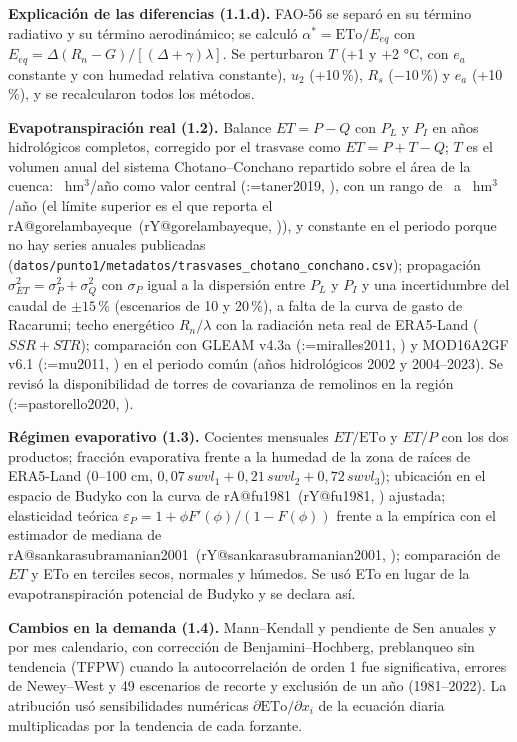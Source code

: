 \documentclass[12pt,a4paper]{article}
\makeatletter
\newcommand{\parencite}[2][]{(\@tempswafalse\@for\rk:=#2\do{\if@tempswa; \fi\@tempswatrue\csname rA@\rk\endcsname, \csname rY@\rk\endcsname}\ifx\relax#1\relax\else, #1\fi)}
\newcommand{\textcite}[2][]{\csname rA@#2\endcsname\ (\csname rY@#2\endcsname\ifx\relax#1\relax\else, #1\fi)}
\makeatother
\begin{document}
\textbf{Explicación de las diferencias (1.1.d).} FAO-56 se separó en su término radiativo y su término aerodinámico; se calculó $\alpha^*=\mathrm{ETo}/E_{eq}$ con $E_{eq}=\Delta(R_n-G)/[(\Delta+\gamma)\lambda]$. Se perturbaron $T$ (+1 y +2 °C, con $e_a$ constante y con humedad relativa constante), $u_2$ (+10\,\%), $R_s$ ($-10$\,\%) y $e_a$ (+10\,\%), y se recalcularon todos los métodos.

\textbf{Evapotranspiración real (1.2).} Balance $ET=P-Q$ con $P_L$ y $P_I$ en años hidrológicos completos, corregido por el trasvase como $ET=P+T-Q$; $T$ es el volumen anual del sistema Chotano--Conchano repartido sobre el área de la cuenca: \TrHmCen\ hm$^3$/año como valor central \parencite{taner2019}, con un rango de \TrHmInf\ a \TrHmSup\ hm$^3$/año (el límite superior es el que reporta el \textcite{gorelambayeque}), y constante en el periodo porque no hay series anuales publicadas (\texttt{datos/punto1/metadatos/trasvases\_chotano\_conchano.csv}); propagación $\sigma^2_{ET}=\sigma^2_P+\sigma^2_Q$ con $\sigma_P$ igual a la dispersión entre $P_L$ y $P_I$ y una incertidumbre del caudal de $\pm15$\,\% (escenarios de 10 y 20\,\%), a falta de la curva de gasto de Racarumi; techo energético $R_n/\lambda$ con la radiación neta real de ERA5-Land ($SSR+STR$); comparación con GLEAM v4.3a \parencite{miralles2011} y MOD16A2GF v6.1 \parencite{mu2011} en el periodo común (años hidrológicos 2002 y 2004--2023). Se revisó la disponibilidad de torres de covarianza de remolinos en la región \parencite{pastorello2020}.

\textbf{Régimen evaporativo (1.3).} Cocientes mensuales $ET/\mathrm{ETo}$ y $ET/P$ con los dos productos; fracción evaporativa frente a la humedad de la zona de raíces de ERA5-Land (0--100 cm, $0{,}07\,swvl_1+0{,}21\,swvl_2+0{,}72\,swvl_3$); ubicación en el espacio de Budyko con la curva de \textcite{fu1981} ajustada; elasticidad teórica $\varepsilon_P=1+\phi F'(\phi)/(1-F(\phi))$ frente a la empírica con el estimador de mediana de \textcite{sankarasubramanian2001}; comparación de $ET$ y ETo en terciles secos, normales y húmedos. Se usó ETo en lugar de la evapotranspiración potencial de Budyko y se declara así.

\textbf{Cambios en la demanda (1.4).} Mann--Kendall y pendiente de Sen anuales y por mes calendario, con corrección de Benjamini--Hochberg, preblanqueo sin tendencia (TFPW) cuando la autocorrelación de orden 1 fue significativa, errores de Newey--West y 49 escenarios de recorte y exclusión de un año (1981--2022). La atribución usó sensibilidades numéricas $\partial\mathrm{ETo}/\partial x_i$ de la ecuación diaria multiplicadas por la tendencia de cada forzante.
\end{document}
